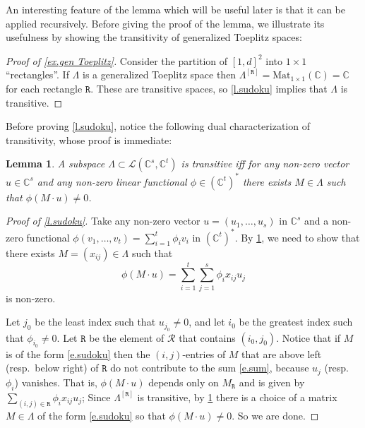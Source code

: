 \documentclass[10pt, a4paper]{amsart}
\theoremstyle{plain}
\newtheorem{lemma}{Lemma}[section]
\theoremstyle{definition}
\theoremstyle{remark}
\theoremstyle{note}
\numberwithin{equation}{section}
\begin{document}
An interesting feature of the lemma which will be useful later is that 
it can be applied recursively.
Before giving the proof of the lemma, 
we illustrate its usefulness by showing the transitivity
of generalized Toeplitz spaces:

\begin{proof}[Proof of \cref{ex.gen Toeplitz}]
Consider the partition of $[1,d]^2$ into $1 \times 1$ ``rectangles''.
If $\Lambda$ is a generalized Toeplitz space then 
$\Lambda^{[{\mathtt{R}}]} = {\mathrm{Mat}}_{1\times 1}({\mathbb{C}}) = {\mathbb{C}}$ for each rectangle ${\mathtt{R}}$.
These are transitive spaces, so \cref{l.sudoku} implies that $\Lambda$
is transitive.
\end{proof}

Before proving \cref{l.sudoku}, notice the following dual characterization of transitivity, whose proof is immediate:

\begin{lemma}\label{l.duality}
A subspace $\Lambda \subset \mathcal{L}({\mathbb{C}}^s,{\mathbb{C}}^t)$ is transitive iff
for any non-zero vector $u \in {\mathbb{C}}^s$ and any non-zero linear functional $\phi \in ({\mathbb{C}}^t)^*$
there exists $M \in \Lambda$ such that $\phi (M \cdot u) \neq 0$.
\end{lemma}

\begin{proof}[Proof of \cref{l.sudoku}]
Take any non-zero vector $u = (u_1,\ldots,u_s)$ in ${\mathbb{C}}^s$
and a non-zero functional $\phi(v_1,\ldots,v_t) = \sum_{i=1}^t \phi_i v_i$ in $({\mathbb{C}}^t)^*$.
By \cref{l.duality}, we need to show that there exists $M = (x_{ij}) \in \Lambda$ such that 
\begin{equation}\label{e.sum}
\phi (M \cdot u) = \sum_{i=1}^t \sum_{j=1}^s \phi_i x_{ij} u_j
\end{equation}
is non-zero.

Let $j_0$ be the least index such that $u_{j_0} \neq 0$,
and let $i_0$ be the greatest index such that $\phi_{i_0} \neq 0$.
Let ${\mathtt{R}}$ be the element of $\mathcal{R}$ that contains $(i_0,j_0)$. 
Notice that if $M$ is of the form \eqref{e.sudoku} then
the $(i,j)$-entries of $M$ that are above left (resp.\ below right) of ${\mathtt{R}}$
do not contribute to the sum \eqref{e.sum}, because $u_j$ (resp.\ $\phi_i$) vanishes.
That is,
$\phi (M \cdot u)$ depends only on $M_{\mathtt{R}}$ 
and is given by $\sum_{(i,j)\in {\mathtt{R}}} \phi_i x_{ij} u_j$;
Since $\Lambda^{[{\mathtt{R}}]}$ is transitive, by \cref{l.duality}
there is a choice of a matrix $M \in \Lambda$ of the form \eqref{e.sudoku}
so that $\phi (M \cdot u) \neq 0$.
So we are done.
\end{proof}
\end{document}
